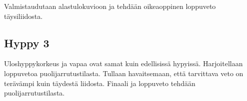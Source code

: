 Valmistaudutaan alastulokuvioon ja tehdään oikeaoppinen loppuveto täysiliidosta. 

\subsection{ Hyppy 3 }
\label{kuvunkasittely-oppilaana-hyppy-3}


Uloshyppykorkeus ja vapaa ovat samat kuin edellisissä hypyissä. Harjoitellaan loppuvetoa puolijarrutustilasta. Tullaan havaitsemaan, että tarvittava veto on terävämpi kuin täydestä liidosta. Finaali ja loppuveto tehdään puolijarrutustilasta. 

